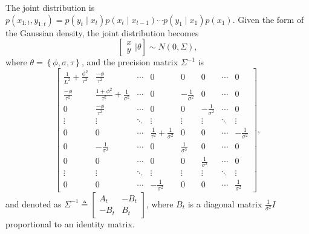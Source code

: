 The joint distribution is $p(x_{1:t},y_{1:t}) = p(y_t\mid x_t)p(x_t\mid x_{t-1})\cdots p(y_1\mid x_1)p(x_1)$. Given the form of the Gaussian density, the joint distribution becomes 
\begin{equation*}
\left[ \begin{matrix} x\\y  \end{matrix}\bigg\rvert \theta \right]
\sim N\left(0, \Sigma  \right),
\end{equation*}
where $\theta = \left\lbrace \phi,\sigma,\tau\right\rbrace$, and the precision matrix $\Sigma^{-1}$ is  
\begin{equation*}
\begin{bmatrix}
\frac{1}{L^2}+\frac{\phi^2}{\tau^2} & \frac{-\phi}{\tau^2} & \cdots & 0 & 0 & 0& \cdots & 0\\
\frac{-\phi}{\tau^2}   & \frac{1+\phi^2}{\tau^2}+\frac{1}{\sigma^2}& \cdots & 0 & -\frac{1}{\sigma^2} &0 & \cdots & 0 \\
0 & \frac{-\phi}{\tau^2}   &  \cdots & 0 & 0& -\frac{1}{\sigma^2} & \cdots & 0\\
\vdots & \vdots & \ddots & \vdots & \vdots & \vdots & \ddots & \vdots \\
0 & 0   &  \cdots & \frac{1}{\tau^2}+\frac{1}{\sigma^2} & 0 & 0 & \cdots &-\frac{1}{\sigma^2}\\
0 & -\frac{1}{\sigma^2}  & \cdots & 0 & \frac{1}{\sigma^2} & 0 & \cdots & 0 \\
0& 0 & \cdots & 0 & 0 &  \frac{1}{\sigma^2} & \cdots & 0\\
\vdots & \vdots & \ddots & \vdots & \vdots & \vdots & \ddots & \vdots\\
0 & 0& \cdots &-\frac{1}{\sigma^2} & 0 & 0 & \cdots &  \frac{1}{\sigma^2}
\end{bmatrix},
\end{equation*}
and denoted as $\Sigma^{-1}\triangleq\begin{bmatrix} A_t & -B_t \\ -B_t & B_t \end{bmatrix}$, 
where $B_t$ is a diagonal matrix $\frac{1}{\sigma^2}I$ proportional to an identity matrix. 


